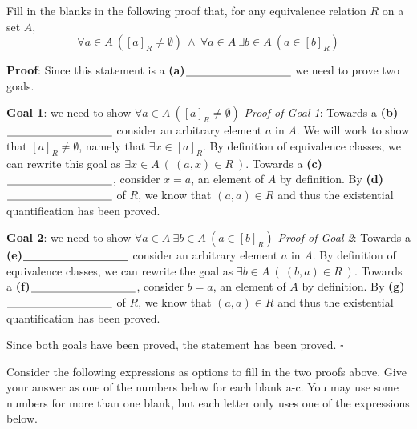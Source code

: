 
Fill in the blanks in the following proof that, for any equivalence relation $R$ on a set $A$,
\[
\forall a \in A ~([a]_R \neq \emptyset) ~\land ~\forall a \in A ~\exists b \in A~\left( a \in [b]_R \right)
\]

{\bf Proof}: Since this statement is a  \textbf{(a)}$\underline{\phantom{\hspace{1.3in}}}$
we need to prove two goals.

{\bf Goal 1}: we need to show $\forall a \in A ~([a]_R \neq \emptyset) $
{\it Proof of Goal 1}: Towards a \textbf{(b)}$\underline{\phantom{\hspace{1.3in}}}$ 
consider an arbitrary element $a$ in $A$. 
We will work to show that $[a]_R \neq \emptyset$, namely that $\exists x \in [a]_R$.
By definition of equivalence classes, we can rewrite this goal as 
$\exists x \in A ~( ~(a,x) \in R~)$. 
 Towards a \textbf{(c)}$\underline{\phantom{\hspace{1.3in}}}$, consider $x = a$, 
 an element of $A$ by definition. By \textbf{(d)}$\underline{\phantom{\hspace{1.3in}}}$  of $R$, we know that $(a,a) \in R$  and thus the existential quantification has been proved.
 
{\bf Goal 2}: we need to show $\forall a \in A ~\exists b \in A~\left( a \in [b]_R \right)$
{\it Proof of Goal 2}: Towards a \textbf{(e)}$\underline{\phantom{\hspace{1.3in}}}$ 
consider an arbitrary element $a$ in $A$. By definition of equivalence classes, we can rewrite the goal as 
$\exists b \in A ~( ~(b,a) \in R~)$. 
 Towards a \textbf{(f)}$\underline{\phantom{\hspace{1.3in}}}$, consider $b = a$, 
 an element of $A$ by definition. By \textbf{(g)}$\underline{\phantom{\hspace{1.3in}}}$  of $R$, we know that $(a,a) \in R$  and thus the existential quantification has been proved. 
 
 Since both goals have been proved, the statement has been proved. $\square$
 
 
Consider the following expressions as options to fill in the two proofs above. Give your answer as one of the numbers below for each blank a-c. You may use some numbers for more than one blank, but each letter only uses one of the expressions below.

